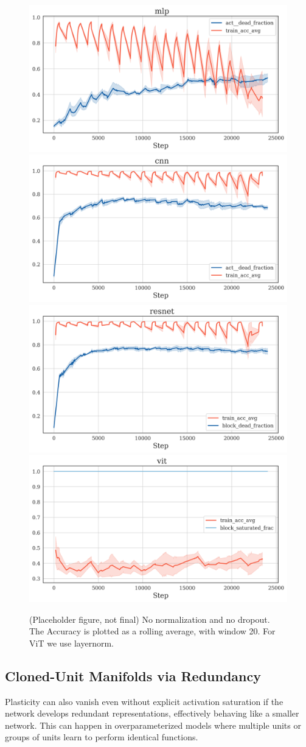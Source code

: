 \documentclass{article}
\begin{document}
\begin{figure}[h!]
    \centering
    \includegraphics[width=0.4\linewidth]{paper/images/dead_frac_mlp.png}
    \includegraphics[width=0.4\linewidth]{paper/images/dead_frac_cnn.png}
    \includegraphics[width=0.4\linewidth]{paper/images/dead_frac_resnet.png}
    \includegraphics[width=0.4\linewidth]{paper/images/sat_frac_vit.png}
    
    \caption{(Placeholder figure, not final) No normalization and no dropout. The Accuracy is plotted as a rolling average, with window 20. For ViT we use layernorm.}
    \label{fig:DeadReLUs-LoP}
\end{figure}


\subsection{Cloned-Unit Manifolds via Redundancy}

Plasticity can also vanish even without explicit activation saturation if the network develops redundant representations, effectively behaving like a smaller network. This can happen in overparameterized models where multiple units or groups of units learn to perform identical functions.
\end{document}
